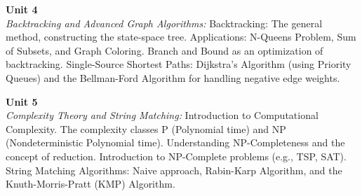 \vspace{0.3cm}

\noindent\textbf{Unit 4} \\
\textit{Backtracking and Advanced Graph Algorithms:} Backtracking: The general method, constructing the state-space tree. Applications: N-Queens Problem, Sum of Subsets, and Graph Coloring. Branch and Bound as an optimization of backtracking. Single-Source Shortest Paths: Dijkstra's Algorithm (using Priority Queues) and the Bellman-Ford Algorithm for handling negative edge weights.

\vspace{0.3cm}

\noindent\textbf{Unit 5} \\
\textit{Complexity Theory and String Matching:} Introduction to Computational Complexity. The complexity classes P (Polynomial time) and NP (Nondeterministic Polynomial time). Understanding NP-Completeness and the concept of reduction. Introduction to NP-Complete problems (e.g., TSP, SAT). String Matching Algorithms: Naive approach, Rabin-Karp Algorithm, and the Knuth-Morris-Pratt (KMP) Algorithm.

\newpage
{}